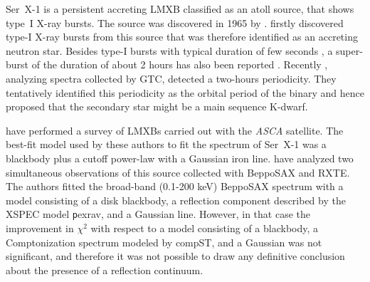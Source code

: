 \documentclass{aa}
\begin{document}
Ser~X-1 is a persistent accreting LMXB classified as an atoll source, 
that shows type~I X-ray bursts. 
The source  was discovered in 1965 by
\citet{Friedman.etal:67}. \citet{Li.etal:76} firstly discovered type-I X-ray bursts 
from this source that was therefore identified as an accreting neutron star.
Besides type-I bursts with typical duration of few 
seconds \citep{Balucinska.etal:85}, a super-burst of the
duration of about 2 hours has also been reported \citep{Cornelisse.etal:02}.
Recently \citet{Cornelisse.etal:13}, analyzing spectra collected by GTC, 
detected a two-hours periodicity. They tentatively identified this periodicity 
as the orbital period of the binary and hence proposed that the secondary star  
might be a main sequence K-dwarf.


\cite{Church.etal:01} have performed a survey of LMXBs carried out with 
the \emph{ASCA} satellite. The best-fit model used by these authors to fit the 
spectrum of Ser~X-1 was a blackbody plus a cutoff power-law with a Gaussian iron 
line. 
\cite{Ooster.etal:01} have analyzed two simultaneous observations 
of this source collected with BeppoSAX and RXTE.  The authors fitted  the
broad-band (0.1-200 keV) BeppoSAX spectrum with a model consisting of a
disk blackbody, a reflection component described by the XSPEC model 
{\texttt pexrav}, and a Gaussian line. 
However, in that case the improvement in $\chi^2$ with respect to a model 
consisting of a blackbody, a Comptonization spectrum modeled by compST, 
and a Gaussian was not significant, and therefore it was not possible to 
draw any definitive conclusion about the presence of a reflection continuum. 
\end{document}
